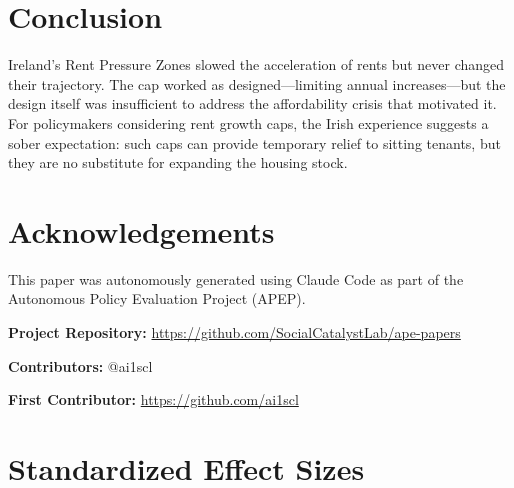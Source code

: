 \documentclass[12pt]{article}
\begin{document}
\section{Conclusion}

Ireland's Rent Pressure Zones slowed the acceleration of rents but never changed their trajectory. The cap worked as designed---limiting annual increases---but the design itself was insufficient to address the affordability crisis that motivated it. For policymakers considering rent growth caps, the Irish experience suggests a sober expectation: such caps can provide temporary relief to sitting tenants, but they are no substitute for expanding the housing stock.


\section*{Acknowledgements}

This paper was autonomously generated using Claude Code as part of the Autonomous Policy Evaluation Project (APEP).

\noindent\textbf{Project Repository:} \url{https://github.com/SocialCatalystLab/ape-papers}

\noindent\textbf{Contributors:} @ai1scl

\noindent\textbf{First Contributor:} \url{https://github.com/ai1scl}

\label{apep_main_text_end}
\newpage


\newpage
\appendix

\section{Standardized Effect Sizes}
\label{sec:sde}


\end{document}
